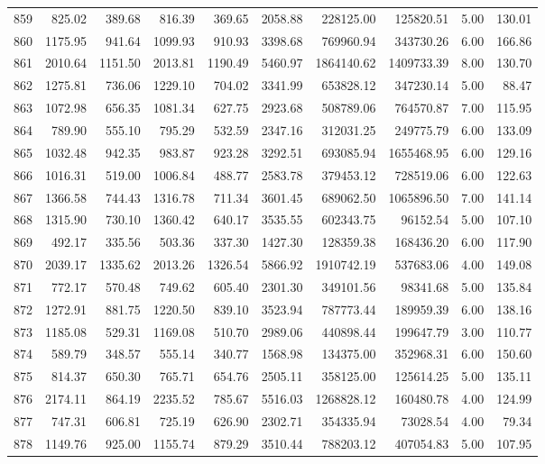 \begin{tabular}{lrrrrrrrrr}
859 & 825.02 & 389.68 & 816.39 & 369.65 & 2058.88 & 228125.00 & 125820.51 & 5.00 & 130.01 \\
860 & 1175.95 & 941.64 & 1099.93 & 910.93 & 3398.68 & 769960.94 & 343730.26 & 6.00 & 166.86 \\
861 & 2010.64 & 1151.50 & 2013.81 & 1190.49 & 5460.97 & 1864140.62 & 1409733.39 & 8.00 & 130.70 \\
862 & 1275.81 & 736.06 & 1229.10 & 704.02 & 3341.99 & 653828.12 & 347230.14 & 5.00 & 88.47 \\
863 & 1072.98 & 656.35 & 1081.34 & 627.75 & 2923.68 & 508789.06 & 764570.87 & 7.00 & 115.95 \\
864 & 789.90 & 555.10 & 795.29 & 532.59 & 2347.16 & 312031.25 & 249775.79 & 6.00 & 133.09 \\
865 & 1032.48 & 942.35 & 983.87 & 923.28 & 3292.51 & 693085.94 & 1655468.95 & 6.00 & 129.16 \\
866 & 1016.31 & 519.00 & 1006.84 & 488.77 & 2583.78 & 379453.12 & 728519.06 & 6.00 & 122.63 \\
867 & 1366.58 & 744.43 & 1316.78 & 711.34 & 3601.45 & 689062.50 & 1065896.50 & 7.00 & 141.14 \\
868 & 1315.90 & 730.10 & 1360.42 & 640.17 & 3535.55 & 602343.75 & 96152.54 & 5.00 & 107.10 \\
869 & 492.17 & 335.56 & 503.36 & 337.30 & 1427.30 & 128359.38 & 168436.20 & 6.00 & 117.90 \\
870 & 2039.17 & 1335.62 & 2013.26 & 1326.54 & 5866.92 & 1910742.19 & 537683.06 & 4.00 & 149.08 \\
871 & 772.17 & 570.48 & 749.62 & 605.40 & 2301.30 & 349101.56 & 98341.68 & 5.00 & 135.84 \\
872 & 1272.91 & 881.75 & 1220.50 & 839.10 & 3523.94 & 787773.44 & 189959.39 & 6.00 & 138.16 \\
873 & 1185.08 & 529.31 & 1169.08 & 510.70 & 2989.06 & 440898.44 & 199647.79 & 3.00 & 110.77 \\
874 & 589.79 & 348.57 & 555.14 & 340.77 & 1568.98 & 134375.00 & 352968.31 & 6.00 & 150.60 \\
875 & 814.37 & 650.30 & 765.71 & 654.76 & 2505.11 & 358125.00 & 125614.25 & 5.00 & 135.11 \\
876 & 2174.11 & 864.19 & 2235.52 & 785.67 & 5516.03 & 1268828.12 & 160480.78 & 4.00 & 124.99 \\
877 & 747.31 & 606.81 & 725.19 & 626.90 & 2302.71 & 354335.94 & 73028.54 & 4.00 & 79.34 \\
878 & 1149.76 & 925.00 & 1155.74 & 879.29 & 3510.44 & 788203.12 & 407054.83 & 5.00 & 107.95 \\

\end{tabular}
